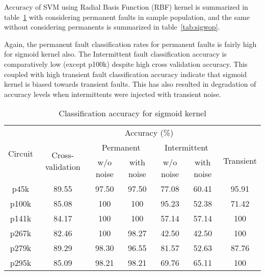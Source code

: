 Accuracy of SVM using Radial Basis Function (RBF) kernel is summarized in table~\ref{tab:sigwp} with considering permanent faults in sample population, and the same without considering permanents is summarized in table~\ref{tab:sigwop}.

Again, the permanent fault classification rates for permanent faults is fairly high for sigmoid kernel also. The Intermittent fault classification accuracy is comparatively low (except p100k) despite high cross validation accuracy. This coupled with high transient fault classification accuracy indicate that sigmoid kernel is biased towards transient faults. This has also resulted in degradation of accuracy levels when intermittents were injected with transient noise.

\begin{table}[h]

	\captionsetup{justification=centering}
\begin{tabular}{ccccccc}
\hline
\multirow{3}{*}{Circuit} & \multicolumn{6}{c}{Accuracy (\%)}\\ \cline{2-7} 
                         & \multirow{2}{*}{Cross-validation} & \multicolumn{2}{c}{Permanent} & \multicolumn{2}{c}{Intermittent} & \multirow{2}{*}{Transient} \\ \cline{3-6}
                         &                                   & w/o noise     & with noise    & w/o noise      & with noise      &                            \\ \hline
p45k                     & 89.55                             & 97.50         & 97.50         & 77.08          & 60.41           & 95.91                      \\
p100k                    & 85.08                             & 100           & 100           & 95.23          & 52.38           & 71.42                      \\
p141k                    & 84.17                             & 100           & 100           & 57.14          & 57.14           & 100                        \\
p267k                    & 82.46                             & 100           & 98.27         & 42.50          & 42.50           & 100                        \\
p279k                    & 89.29                             & 98.30         & 96.55         & 81.57          & 52.63           & 87.76                      \\
p295k                    & 85.09                             & 98.21         & 98.21         & 69.76          & 65.11           & 100                       \\
\hline                                                     
\end{tabular}
\caption {Classification accuracy for sigmoid kernel}
\label{tab:sigwp}
\end{table}

